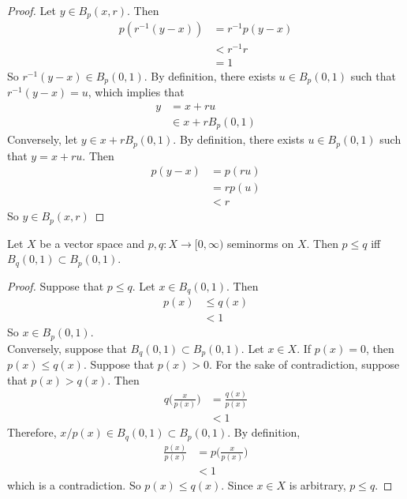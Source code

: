 \documentclass{book}
\begin{document}
	\begin{proof}
		Let $y \in B_p(x, r)$. Then  
		\begin{align*}
			p(r^{-1}(y - x)) 
			&= r^{-1}p(y - x) \\
			&< r^{-1} r \\
			&= 1
		\end{align*}
		So $r^{-1}(y - x) \in B_p(0, 1)$. By definition, there exists $u \in B_p(0,1)$ such that $r^{-1}(y - x) = u$, which implies that 
		\begin{align*}
			y 
			&=  x + ru \\
			&\in x + rB_p(0, 1)
		\end{align*} 
		Conversely, let $y \in x + rB_p(0, 1)$. By definition, there exists $u \in B_p(0,1)$ such that $y = x + ru$. Then 
		\begin{align*}
			p(y - x) 
			&= p(ru) \\
			&= rp(u) \\
			&< r
		\end{align*}
	So $y \in B_p(x, r)$ 
	\end{proof}

	\begin{ex}
		Let $X$ be a vector space and $p,q:X \rightarrow [0, \infty)$ seminorms on $X$. Then $p \leq q$ iff $B_q(0,1) \subset B_p(0,1)$.  
	\end{ex}

	\begin{proof}
		Suppose that $p \leq q$. Let $x \in B_q(0,1)$. Then 
		\begin{align*}
			p(x) 
			& \leq q(x) \\
			& < 1
		\end{align*}
		So $x \in B_p(0,1)$. \\
		Conversely, suppose that $B_q(0,1) \subset B_p(0,1)$. Let $x \in X$. If $p(x) = 0$, then $p(x) \leq q(x)$. Suppose that $p(x) > 0$. For the sake of contradiction, suppose that $p(x) > q(x)$. Then 
		\begin{align*}
			q \bigg( \frac{x}{p(x)}\bigg) 
			&= \frac{q(x)}{p(x)} \\
			& < 1
		\end{align*}
		Therefore, $x/p(x) \in B_q(0,1) \subset B_p(0,1)$. By definition,
		\begin{align*}
			\frac{p(x)}{p(x)}
			& =  p\bigg( \frac{x}{p(x)}\bigg)\\
			&< 1
		\end{align*} 
		which is a contradiction. So $p(x) \leq q(x)$. Since $x \in X$ is arbitrary, $p \leq q$.
	\end{proof}
\end{document}
